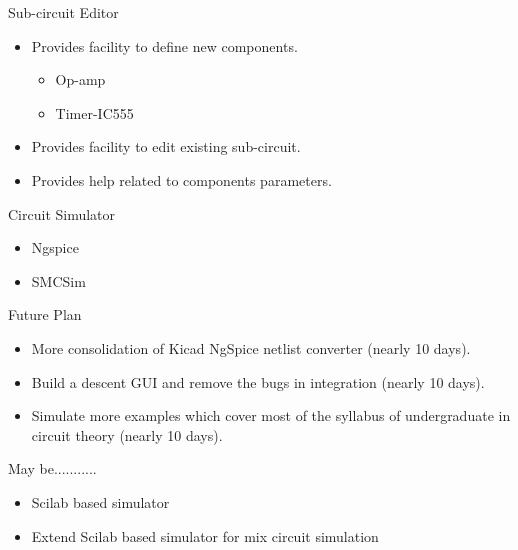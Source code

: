 \documentclass{beamer}
\begin{document}
\begin{frame}
  \begin{block}{Sub-circuit Editor}
    \begin{itemize}
            \item Provides facility to define new components.
    \begin{itemize}
            \item Op-amp
            \item Timer-IC555
    \end{itemize}
            \item Provides facility to edit existing sub-circuit.
            \item Provides help related to components parameters.
    \end{itemize}
  \end{block}
\end{frame}

\begin{frame}
\begin{block}{Circuit Simulator}
\begin{itemize}
\item Ngspice
\item SMCSim
\end{itemize}
\end{block}
\end{frame}

\begin{frame}
\begin{block}{Future Plan}
\begin{itemize}
\item More consolidation of Kicad NgSpice netlist converter (nearly 10 days).
\item Build a descent GUI and remove the bugs in integration (nearly 10 days).
\item Simulate more examples which cover most of the syllabus of undergraduate in circuit theory (nearly 10 days). 
\end{itemize}
\end{block}
\end{frame}

\begin{frame}
\begin{block}{May be...........}
\begin{itemize}
\item Scilab based simulator 
\item Extend Scilab based simulator for mix circuit simulation
\end{itemize}
\end{block}
\end{frame}
\end{document}
